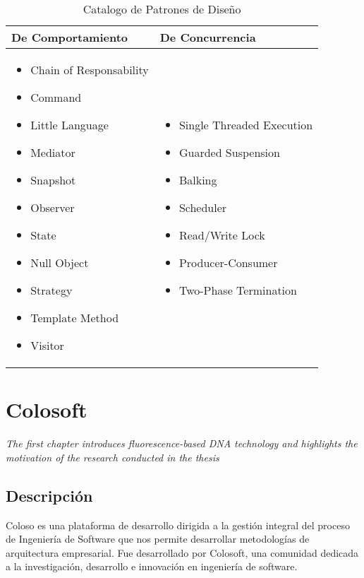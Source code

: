   \begin{table}[H]
  	\centering
  	\begin{tabular}{p{7cm}|p{7cm}}  		
  		\midrule
  		\textbf{De Comportamiento} & \textbf{De Concurrencia} \\
  		\midrule
  		\begin{itemize}
  			\item Chain of Responsability
  			\item Command
  			\item Little Language
  			\item Mediator
  			\item Snapshot
  			\item Observer
  			\item State
  			\item Null Object
  			\item Strategy
  			\item Template Method
  			\item Visitor
  		\end{itemize} &
  		\begin{itemize}
  			\item Single Threaded Execution
  			\item Guarded Suspension
  			\item Balking
  			\item Scheduler
  			\item Read/Write Lock
  			\item Producer-Consumer
  			\item Two-Phase Termination
  		\end{itemize} \\
  		\bottomrule
  	\end{tabular}
  	\captionsetup{width=.95\textwidth}
  	\caption{Catalogo de Patrones de Diseño}
  	\label{tabla3} 
  \end{table}

\chapter{Colosoft}
\label{chap:coloso}
\textit{The first chapter introduces fluorescence-based DNA technology and highlights the motivation of the research conducted in the thesis}
\vfill
\minitoc
\newpage

\section{Descripción}
Coloso es una plataforma de desarrollo dirigida a la gestión integral del proceso de Ingeniería de Software que nos permite desarrollar metodologías de arquitectura empresarial. Fue desarrollado por Colosoft, una comunidad dedicada a la investigación, desarrollo e innovación en ingeniería de software. \\

